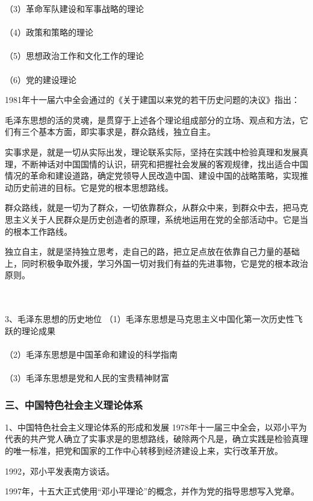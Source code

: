 \documentclass{ctexart}
\begin{document}
（3）革命军队建设和军事战略的理论
\\\\

（4）政策和策略的理论
\\\\

（5）思想政治工作和文化工作的理论
\\\\

（6）党的建设理论

1981年十一届六中全会通过的《关于建国以来党的若干历史问题的决议》指出：

毛泽东思想的活的灵魂，是贯穿于上述各个理论组成部分的立场、观点和方法，它们有三个基本方面，即实事求是，群众路线，独立自主。

实事求是，就是一切从实际出发，理论联系实际，坚持在实践中检验真理和发展真理，不断神话对中国国情的认识，研究和把握社会发展的客观规律，找出适合中国情况的革命和建设道路，确定党领导人民改造中国、建设中国的战略策略，实现推动历史前进的目标。它是党的根本思想路线。

群众路线，就是一切为了群众，一切依靠群众，从群众中来，到群众中去，把马克思主义关于人民群众是历史创造者的原理，系统地运用在党的全部活动中。它是当的根本工作路线。

独立自主，就是坚持独立思考，走自己的路，把立足点放在依靠自己力量的基础上，同时积极争取外援，学习外国一切对我们有益的先进事物，它是党的根本政治原则。

\\\\

3、毛泽东思想的历史地位
（1）毛泽东思想是马克思主义中国化第一次历史性飞跃的理论成果
\\\\
（2）毛泽东思想是中国革命和建设的科学指南
\\\\
（3）毛泽东思想是党和人民的宝贵精神财富

\subsubsection{三、中国特色社会主义理论体系}
1、中国特色社会主义理论体系的形成和发展
1978年十一届三中全会，以邓小平为代表的共产党人确立了实事求是的思想路线，破除两个凡是，确立实践是检验真理的唯一标准，把党和国家的工作中心转移到经济建设上来，实行改革开放。

1992，邓小平发表南方谈话。

1997年，十五大正式使用“邓小平理论”的概念，并作为党的指导思想写入党章。
\end{document}
